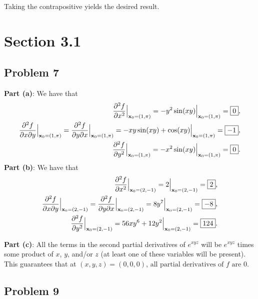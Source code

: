 \documentclass[11pt]{article}
\renewcommand{\vec}[1]{\mathbf{#1}}
\begin{document}
Taking the contrapositive yields the desired result.


\section{Section 3.1}


\subsection{Problem 7}

\textbf{Part (a)}: We have that
\begin{align*}
	\pdv[2]{f}{x} \Big|_{\vec{x}_{0} = (1, \pi)} = - y^{2} \sin(xy) \Big|_{\vec{x}_{0} = (1, \pi)} = \boxed{0}, \\
	\pdv[2]{f}{x}{y} \Big|_{\vec{x}_{0} = (1, \pi)} = \pdv[2]{f}{y}{x} \Big|_{\vec{x}_{0} = (1, \pi)} = -xy \sin(xy) + \cos(xy) \Big|_{\vec{x}_{0} = (1, \pi)} = \boxed{-1}, \\
	\pdv[2]{f}{y} \Big|_{\vec{x}_{0} = (1, \pi)} = - x^{2} \sin(xy) \Big|_{\vec{x}_{0} = (1, \pi)} = \boxed{0}.
\end{align*}
\textbf{Part (b)}: We have that
\begin{align*}
	\pdv[2]{f}{x} \Big|_{\vec{x}_{0} = (2, -1)} = 2  \Big|_{\vec{x}_{0} = (2, -1)} = \boxed{2}, \\
	\pdv[2]{f}{x}{y} \Big|_{\vec{x}_{0} = (2, -1)} = 	\pdv[2]{f}{y}{x} \Big|_{\vec{x}_{0} = (2, -1)} = 8y^{7} \Big|_{\vec{x}_{0} = (2, -1)} = \boxed{-8}, \\
	\pdv[2]{f}{y} \Big|_{\vec{x}_{0} = (2, -1)} = 56xy^{6} + 12y^{2}  \Big|_{\vec{x}_{0} = (2, -1)} = \boxed{124}.
\end{align*}

\textbf{Part (c)}: All the terms in the second partial derivatives of $e^{xyz}$ will be $e^{xyz}$ times some product of $x$, $y$, and/or $z$ (at least one of these variables will be present). This guarantees that at $(x, y, z) = (0, 0, 0)$, $\boxed{\text{all partial derivatives of $f$ are $0$}}$.


\subsection{Problem 9}
\end{document}
